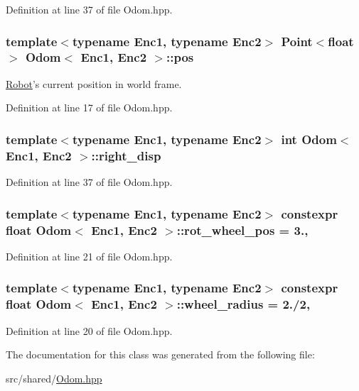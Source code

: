 Definition at line 37 of file Odom.\-hpp.

\hypertarget{classOdom_a0e43d9feb433dec91e7a08cee64d732b}{
\subsubsection[{pos}]{\setlength{\rightskip}{0pt plus 5cm}template$<$typename Enc1, typename Enc2$>$ {\bf Point}$<$float$>$ {\bf Odom}$<$ Enc1, Enc2 $>$\-::pos\hspace{0.3cm}{\ttfamily [private]}}}\label{classOdom_a0e43d9feb433dec91e7a08cee64d732b}


\hyperlink{classRobot}{Robot}'s current position in world frame. 



Definition at line 17 of file Odom.\-hpp.

\hypertarget{classOdom_a967a8ce7e6bea53de203e37cf180389a}{
\subsubsection[{right\-\_\-disp}]{\setlength{\rightskip}{0pt plus 5cm}template$<$typename Enc1, typename Enc2$>$ int {\bf Odom}$<$ Enc1, Enc2 $>$\-::right\-\_\-disp}}\label{classOdom_a967a8ce7e6bea53de203e37cf180389a}


Definition at line 37 of file Odom.\-hpp.

\hypertarget{classOdom_a3d72db210126e10ebcae996e1e707ce5}{
\subsubsection[{rot\-\_\-wheel\-\_\-pos}]{\setlength{\rightskip}{0pt plus 5cm}template$<$typename Enc1, typename Enc2$>$ constexpr float {\bf Odom}$<$ Enc1, Enc2 $>$\-::rot\-\_\-wheel\-\_\-pos = 3.\hspace{0.3cm}{\ttfamily [static]}, {\ttfamily [private]}}}\label{classOdom_a3d72db210126e10ebcae996e1e707ce5}


Definition at line 21 of file Odom.\-hpp.

\hypertarget{classOdom_a567d0fcf68e65948aed27f27f35e6973}{
\subsubsection[{wheel\-\_\-radius}]{\setlength{\rightskip}{0pt plus 5cm}template$<$typename Enc1, typename Enc2$>$ constexpr float {\bf Odom}$<$ Enc1, Enc2 $>$\-::wheel\-\_\-radius = 2./2\hspace{0.3cm}{\ttfamily [static]}, {\ttfamily [private]}}}\label{classOdom_a567d0fcf68e65948aed27f27f35e6973}


Definition at line 20 of file Odom.\-hpp.



The documentation for this class was generated from the following file\-:\begin{DoxyCompactItemize}
\item 
src/shared/\hyperlink{Odom_8hpp}{Odom.\-hpp}\end{DoxyCompactItemize}
